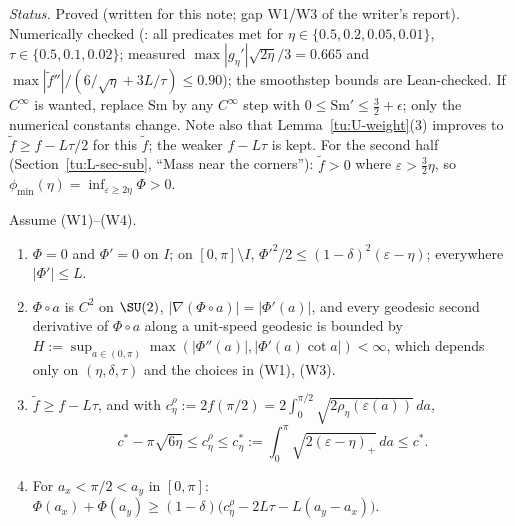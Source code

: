 \noindent\emph{Status.} Proved (written for this note; gap W1/W3 of the writer's report). Numerically checked
(: all predicates met for $\eta\in\{0.5,0.2,0.05,0.01\}$, $\tau\in\{0.5,0.1,0.02\}$; measured
$\max|g_\eta'|\sqrt{2\eta}/3=0.665$ and $\max|\tilde f''|/(6/\sqrt\eta+3L/\tau)\le0.90$); the smoothstep bounds are
Lean-checked. If $C^\infty$ is wanted, replace $\mathrm{Sm}$ by any $C^\infty$ step with $0\le\mathrm{Sm}'\le\frac32+\epsilon$;
only the numerical constants change. Note also that Lemma~\ref{tu:U-weight}(3) improves to $\tilde f\ge f-L\tau/2$
for this $\tilde f$; the weaker $f-L\tau$ is kept. For the second half (Section~\ref{tu:L-sec-sub}, ``Mass near the corners''):
$\tilde f>0$ where $\varepsilon>\frac32\eta$, so $\phi_{\min}(\eta)=\inf_{\varepsilon\ge2\eta}\Phi>0$.

\begin{lemma}\label{tu:U-weight}
Assume (W1)--(W4).
\begin{enumerate}
\item $\Phi=0$ and $\Phi'=0$ on $I$; on $[0,\pi]\setminus I$,
$\Phi'^2/2\le(1-\delta)^2(\varepsilon-\eta)$; everywhere $|\Phi'|\le L$.
\item $\Phi\circ a$ is $C^2$ on $\SU(2)$, $|\nabla(\Phi\circ a)|=|\Phi'(a)|$, and every geodesic second derivative of
$\Phi\circ a$ along a unit-speed geodesic is bounded by $H:=\sup_{a\in(0,\pi)}\max(|\Phi''(a)|,|\Phi'(a)\cot a|)<\infty$, which
depends only on $(\eta,\delta,\tau)$ and the choices in (W1), (W3).
\item $\tilde f\ge f-L\tau$, and with $c^\rho_\eta:=2f(\pi/2)=2\int_0^{\pi/2}\sqrt{2\rho_\eta(\varepsilon(a))}\,da$,
\[
c^*-\pi\sqrt{6\eta}\le c^\rho_\eta\le c^*_\eta:=\int_0^\pi\sqrt{2(\varepsilon-\eta)_+}\,da\le c^* .
\]
\item For $a_x<\pi/2<a_y$ in $[0,\pi]$: $\Phi(a_x)+\Phi(a_y)\ge(1-\delta)\bigl(c^\rho_\eta-2L\tau-L(a_y-a_x)\bigr)$.
\end{enumerate}
\end{lemma}


